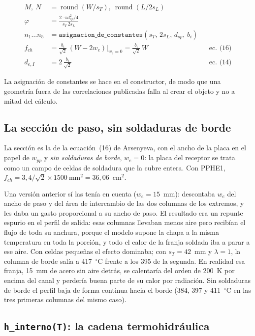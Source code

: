 \documentclass[11pt,a4paper]{article}
\begin{document}
\begin{align}
  M,\ N &= \operatorname{round}(W/s_T),\ \operatorname{round}(L/2s_L) \\
  \varphi &= \frac{2\cdot\pi d_{sp}^2/4}{s_T\,2s_L} \\
  n_1 \ldots n_5 &= \texttt{asignacion\_de\_constantes}(s_T,\, 2s_L,\, d_{sp},\, b_i) \\
  f_{ch} &= \frac{b_i}{\sqrt{2}}\,(W - 2w_e)\Big|_{w_e = 0} = \frac{b_i}{\sqrt{2}}\,W && \text{ec.\ (16)} \\
  d_{e,I} &= 2\,\frac{b_i}{\sqrt{2}} && \text{ec.\ (14)}
\end{align}

La asignación de constantes se hace en el constructor, de modo que una geometría
fuera de las correlaciones publicadas falla al crear el objeto y no a mitad del
cálculo.

\subsection{La sección de paso, sin soldaduras de borde}

La sección es la de la ecuación~(16) de Arsenyeva, con el ancho de la placa en
el papel de $w_{pp}$ y \emph{sin soldaduras de borde}, $w_e = 0$: la placa del
receptor se trata como un campo de celdas de soldadura que la cubre entera. Con
PPHE1, $f_{ch} = 3{,}4/\sqrt{2}\times1500~\mathrm{mm^2} = 36{,}06$~cm$^2$.

Una versión anterior sí las tenía en cuenta ($w_e = 15$~mm): descontaba $w_e$
del ancho de paso y del área de intercambio de las dos columnas de los extremos,
y les daba un gasto proporcional a su ancho de paso. El resultado era un
repunte espurio en el perfil de salida: esas columnas llevaban menos aire pero
recibían el flujo de toda su anchura, porque el modelo supone la chapa a la
misma temperatura en toda la porción, y todo el calor de la franja soldada iba a
parar a ese aire. Con celdas pequeñas el efecto dominaba; con $s_T = 42$~mm y
$\lambda = 1$, la columna de borde salía a 417~$^\circ$C frente a los 395 de la
segunda. En realidad esa franja, 15~mm de acero sin aire detrás, se calentaría
del orden de 200~K por encima del canal y perdería buena parte de su calor por
radiación. Sin soldaduras de borde el perfil baja de forma continua hacia el
borde (384, 397 y 411~$^\circ$C en las tres primeras columnas del mismo caso).

\subsection{\texttt{h\_interno(T)}: la cadena termohidráulica}
\end{document}
